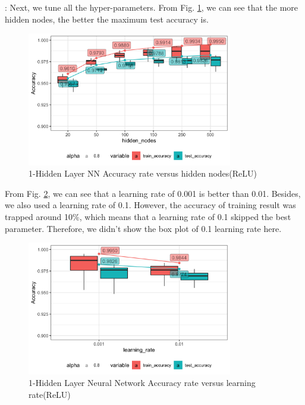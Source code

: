 \documentclass[8pt]{beamer}
\begin{document}
\begin{frame}[allowframebreaks]{\secname : \subsecname}{\subsubsecname}
Next, we tune all the hyper-parameters. From Fig. \ref{1-Hidden Layer Neural Network Accuracy rate versus hidden nodes(ReLU)}, we can see that the more hidden nodes, the better the maximum test accuracy is.
\begin{figure}[htbp]
\centerline{\includegraphics[width=0.8\textwidth]{figure/91-Hidden Layer Neural Network Accuracy rate versus hidden_nodes.png}}
\caption{1-Hidden Layer NN Accuracy rate versus hidden nodes(ReLU)}
\label{1-Hidden Layer Neural Network Accuracy rate versus hidden nodes(ReLU)}
\vspace{-1.5em}
\end{figure}

From Fig. \ref{1-Hidden Layer Neural Network Accuracy rate versus learning rate(ReLU)}, we can see that a learning rate of 0.001 is better than 0.01. Besides, we also used a learning rate of 0.1. However, the accuracy of training result was trapped around 10\%, which means that a learning rate of 0.1 skipped the best parameter. Therefore, we didn't show the box plot of 0.1 learning rate here.
\begin{figure}[htbp]
\centerline{\includegraphics[width=0.8\textwidth]{figure/91-Hidden Layer Neural Network Accuracy rate versus learning_rate.png}}
\caption{1-Hidden Layer Neural Network Accuracy rate versus learning rate(ReLU)}
\label{1-Hidden Layer Neural Network Accuracy rate versus learning rate(ReLU)}
\vspace{-1.5em}
\end{figure}


\end{frame}
\end{document}

